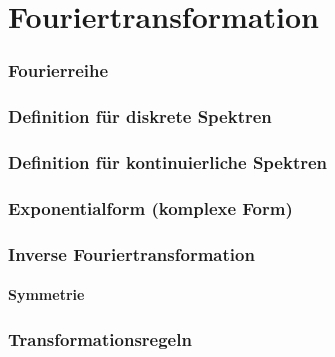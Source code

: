 



\chapter{Fouriertransformation}


\subsection{Fourierreihe}


\subsection{Definition für diskrete Spektren}


\subsection{Definition für kontinuierliche Spektren}


\subsection{Exponentialform (komplexe Form)}


\subsection{Inverse Fouriertransformation}


\subsubsection{Symmetrie}


\subsection{Transformationsregeln}


